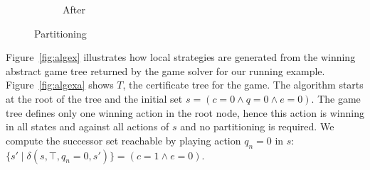 \begin{figure}[b]
\begin{subfigure}[t]{.3\textwidth}
\begin{minipage}[t][3cm][t]{\textwidth}
        \end{minipage}
        \caption{After}
    \end{subfigure}%
    \hspace*{\fill}
    \caption{Partitioning}
    \label{fig:partition}
\end{figure}

Figure~\ref{fig:algex} illustrates how local strategies are generated from the winning abstract game tree returned by the game solver for our running example.  Figure~\ref{fig:algexa} shows $T$, the certificate tree for the game. The algorithm starts at the root of the tree and the initial set $s = (c = 0 \land q = 0 \land e = 0)$.  The game tree defines only one winning action in the root node, hence this action is winning in all states and against all actions of $s$ and no partitioning is required.  We compute the successor set reachable by playing action $q_n = 0$ in $s$: $\{ s' \mid \delta(s, \top, q_n = 0, s') \} = (c = 1 \land e = 0) $.

